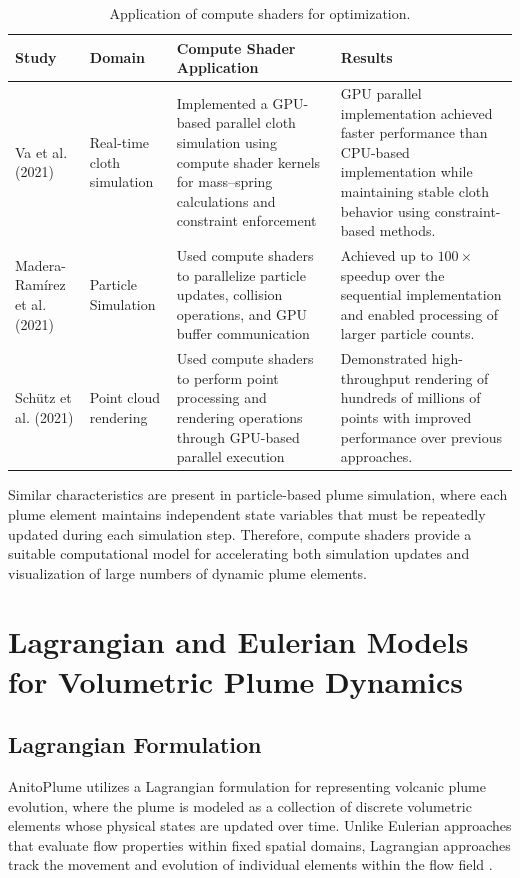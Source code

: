 \begin{table}[H]
\centering
\caption{Application of compute shaders for optimization.}
\vspace{0.2cm}
\renewcommand{\arraystretch}{1.5}
\begin{tabularx}{\textwidth}{|>{\hsize=0.6\hsize}X|>{\hsize=0.8\hsize}X|>{\hsize=1.3\hsize}X|>{\hsize=1.3\hsize}X|}
\hline
\textbf{Study} & \textbf{Domain} & \textbf{Compute Shader Application} & \textbf{Results} \\ \hline
Va et al. (2021) & Real-time cloth simulation & Implemented a GPU-based parallel cloth simulation using compute shader kernels for mass--spring calculations and constraint enforcement & GPU parallel implementation achieved faster performance than CPU-based implementation while maintaining stable cloth behavior using constraint-based methods. \\ \hline
Madera-Ramírez et al. (2021) & Particle Simulation & Used compute shaders to parallelize particle updates, collision operations, and GPU buffer communication & Achieved up to $100\times$ speedup over the sequential implementation and enabled processing of larger particle counts. \\ \hline
Schütz et al. (2021) & Point cloud rendering & Used compute shaders to perform point processing and rendering operations through GPU-based parallel execution & Demonstrated high-throughput rendering of hundreds of millions of points with improved performance over previous approaches. \\ \hline
\end{tabularx}
\end{table}

Similar characteristics are present in particle-based plume simulation, where each plume element maintains independent state variables that must be repeatedly updated during each simulation step. Therefore, compute shaders provide a suitable computational model for accelerating both simulation updates and visualization of large numbers of dynamic plume elements. 

\section{Lagrangian and Eulerian Models for Volumetric Plume Dynamics}

\subsection{Lagrangian Formulation}
AnitoPlume utilizes a Lagrangian formulation for representing volcanic plume evolution, where the plume is modeled as a collection of discrete volumetric elements whose physical states are updated over time.
Unlike Eulerian approaches that evaluate flow properties within fixed spatial domains, Lagrangian approaches track the movement and evolution of individual elements within the flow field \cite{EspostiOngaro2020Validation}.

